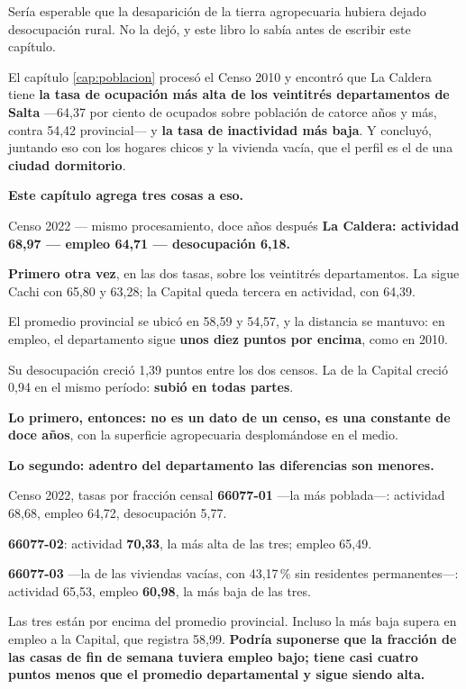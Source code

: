 Sería esperable que la desaparición de la tierra agropecuaria hubiera dejado desocupación rural.
No la dejó, y este libro lo sabía antes de escribir este capítulo.

El capítulo \ref{cap:poblacion} procesó el Censo 2010 y encontró que La Caldera tiene
\textbf{la tasa de ocupación más alta de los veintitrés departamentos de Salta} ---64,37 por
ciento de ocupados sobre población de catorce años y más, contra 54,42 provincial--- y
\textbf{la tasa de inactividad más baja}. Y concluyó, juntando eso con los hogares chicos y la
vivienda vacía, que el perfil es el de una \textbf{ciudad dormitorio}.

\textbf{Este capítulo agrega tres cosas a eso.}

\begin{ficha}{Censo 2022 --- mismo procesamiento, doce años después}
\textbf{La Caldera: actividad 68,97 --- empleo 64,71 --- desocupación 6,18.}

\textbf{Primero otra vez}, en las dos tasas, sobre los veintitrés departamentos. La sigue Cachi
con 65,80 y 63,28; la Capital queda tercera en actividad, con 64,39.

El promedio provincial se ubicó en 58,59 y 54,57, y la distancia se mantuvo: en empleo, el departamento sigue \textbf{unos diez puntos por encima}, como en 2010.

Su desocupación creció 1,39 puntos entre los dos censos. La de la Capital creció 0,94 en el
mismo período: \textbf{subió en todas partes}.
\end{ficha}

\textbf{Lo primero, entonces: no es un dato de un censo, es una constante de doce años}, con la
superficie agropecuaria desplomándose en el medio.

\textbf{Lo segundo: adentro del departamento las diferencias son menores.}

\begin{ficha}{Censo 2022, tasas por fracción censal}
\textbf{66077-01} ---la más poblada---: actividad 68,68, empleo 64,72, desocupación 5,77.

\textbf{66077-02}: actividad \textbf{70,33}, la más alta de las tres; empleo 65,49.

\textbf{66077-03} ---la de las viviendas vacías, con 43,17\,\% sin residentes permanentes---:
actividad 65,53, empleo \textbf{60,98}, la más baja de las tres.
\end{ficha}

Las tres están por encima del promedio provincial. Incluso la más baja supera en empleo a la
Capital, que registra 58,99. \textbf{Podría suponerse que la fracción de las casas de fin de
semana tuviera empleo bajo; tiene casi cuatro puntos menos que el promedio departamental y sigue siendo alta.}


